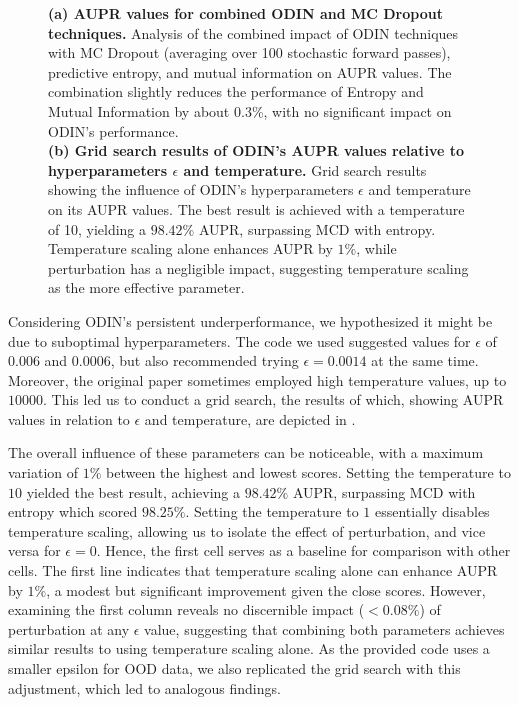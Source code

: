 \begin{figure}[H]
\begin{subfigure}{0.45\textwidth}
        \caption{}
        \label{fig:odin_grid_search}
    \end{subfigure}%
    \caption{\textbf{(a) AUPR values for combined ODIN and MC Dropout techniques.} Analysis of the combined impact of ODIN techniques with MC Dropout (averaging over 100 stochastic forward passes), predictive entropy, and mutual information on AUPR values. The combination slightly reduces the performance of Entropy and Mutual Information by about $0.3\%$, with no significant impact on ODIN's performance.\\\textbf{(b) Grid search results of ODIN's AUPR values relative to hyperparameters $\epsilon$ and temperature.} Grid search results showing the influence of ODIN's hyperparameters $\epsilon$ and temperature on its AUPR values. The best result is achieved with a temperature of 10, yielding a $98.42\%$ AUPR, surpassing MCD with entropy. Temperature scaling alone enhances AUPR by $1\%$, while perturbation has a negligible impact, suggesting temperature scaling as the more effective parameter.}
\end{figure}

Considering ODIN's persistent underperformance, we hypothesized it might be due to suboptimal hyperparameters. The code we used suggested values for $ \epsilon $ of $0.006$ and $0.0006$, but also recommended trying $ \epsilon = 0.0014 $ at the same time. Moreover, the original paper sometimes employed high temperature values, up to $10000$. This led us to conduct a grid search, the results of which, showing AUPR values in relation to $ \epsilon $ and temperature, are depicted in .

The overall influence of these parameters can be noticeable, with a maximum variation of $1\%$ between the highest and lowest scores. Setting the temperature to $ 10 $ yielded the best result, achieving a $98.42\%$ AUPR, surpassing MCD with entropy which scored $98.25\%$. Setting the temperature to $ 1 $ essentially disables temperature scaling, allowing us to isolate the effect of perturbation, and vice versa for $ \epsilon = 0 $. Hence, the first cell serves as a baseline for comparison with other cells. The first line indicates that temperature scaling alone can enhance AUPR by $1\%$, a modest but significant improvement given the close scores. However, examining the first column reveals no discernible impact ($<0.08\%$) of perturbation at any $ \epsilon $ value, suggesting that combining both parameters achieves similar results to using temperature scaling alone. As the provided code uses a smaller epsilon for OOD data, we also replicated the grid search with this adjustment, which led to analogous findings.